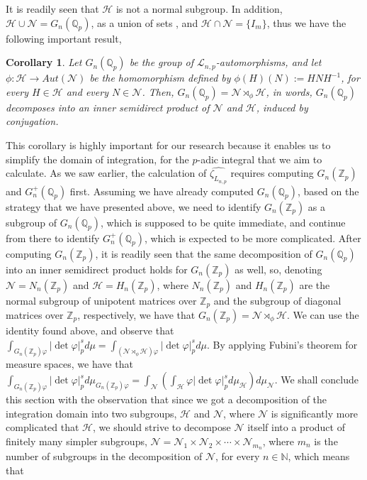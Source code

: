 \documentclass[12pt]{article}
\newtheorem{corollary}[theorem]{Corollary}
\begin{document}
It is readily seen that $\mathcal{H}$ is not a normal subgroup. In addition, $\mathcal{H}\cup \mathcal{N}=G_n(\mathbb{Q}_p)$, as a union of sets , and $\mathcal{H}\cap \mathcal{N}=\{I_m\}$, thus we have the following important result,
\begin{corollary}
Let $G_n(\mathbb{Q}_p)$ be the group of $\mathcal{L}_{n,p}$-automorphisms, and let $\phi:\mathcal{H}\rightarrow Aut(\mathcal{N})$ be the homomorphism defined by $\phi(H)(N):=HNH^{-1}$, for every $H\in \mathcal{H}$ and every $N\in \mathcal{N}$. Then, $G_n(\mathbb{Q}_p)=\mathcal{N}\rtimes_{\phi}\mathcal{H}$, in words, $G_n(\mathbb{Q}_p)$ decomposes into an inner semidirect product of $\mathcal{N}$ and $\mathcal{H}$, induced by conjugation.
\end{corollary}
This corollary is highly important for our research because it enables us to simplify the domain of integration, for the $p$-adic integral that we aim to calculate. As we saw earlier, the calculation of $\hat{\zeta_{L_{n,p}}}$ requires computing $G_n(\mathbb{Z}_p)$ and $G_n^+(\mathbb{Q}_p)$ first. Assuming we have already computed $G_n(\mathbb{Q}_p)$, based on the strategy that we have presented above, we need to identify $G_n(\mathbb{Z}_p)$ as a subgroup of $G_n(\mathbb{Q}_p)$, which is supposed to be quite immediate, and continue from there to identify $G_n^+(\mathbb{Q}_p)$, which is expected to be more complicated. After computing $G_n(\mathbb{Z}_p)$, it is readily seen that the same decomposition of $G_n(\mathbb{Q}_p)$ into an inner semidirect product holds for $G_n(\mathbb{Z}_p)$ as well, so, denoting $\mathcal{N}=N_n(\mathbb{Z}_p)$ and $\mathcal{H}=H_n(\mathbb{Z}_p)$, where $N_n(\mathbb{Z}_p)$ and $H_n(\mathbb{Z}_p)$ are the normal subgroup of unipotent matrices over $\mathbb{Z}_p$ and the subgroup of diagonal matrices over $\mathbb{Z}_p$, respectively, we have that $G_n(\mathbb{Z}_p)=\mathcal{N}\rtimes_{\phi}\mathcal{H}$. We can use the identity found above, and observe that $\displaystyle\int_{G_n(\mathbb{Z}_p)\varphi}|\det\varphi|_p^sd\mu=\displaystyle\int_{(\mathcal{N}\rtimes_{\phi}\mathcal{H})\varphi}|\det\varphi|_p^sd\mu$. By applying Fubini's theorem for measure spaces, we have that $\displaystyle\int_{G_n(\mathbb{Z}_p)\varphi}|\det\varphi|_p^sd\mu_{G_n(\mathbb{Z}_p)\varphi}=\displaystyle\int_{\mathcal{N}}\left(\displaystyle\int_{\mathcal{H}}\varphi|\det\varphi|_p^sd\mu_{\mathcal{H}}\right)d\mu_{\mathcal{N}}$. We shall conclude this section with the observation that since we got a decomposition of the integration domain into two subgroups, $\mathcal{H}$ and $\mathcal{N}$, where $\mathcal{N}$ is significantly more complicated that $\mathcal{H}$, we should strive to decompose $\mathcal{N}$ itself into a product of finitely many simpler subgroups, $\mathcal{N}=\mathcal{N}_1\times\mathcal{N}_2\times\cdots\times\mathcal{N}_{m_n}$, where $m_n$ is the number of subgroups in the decomposition of $\mathcal{N}$, for every $n\in\mathbb{N}$, which means that 
\end{document}
